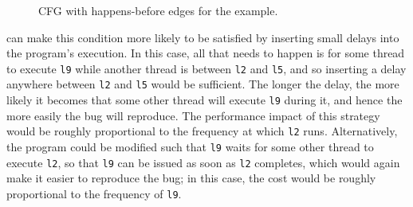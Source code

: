 \begin{figure}
  \caption{CFG with happens-before edges for the example.}
  \label{fig:using:example_hb_graph}
\end{figure}

{\Technique} can make this condition more likely to be satisfied by
inserting small delays into the program's execution.  In this case,
all that needs to happen is for some thread to execute \texttt{l9}
while another thread is between \texttt{l2} and \texttt{l5}, and so
inserting a delay anywhere between \texttt{l2} and \texttt{l5} would
be sufficient.  The longer the delay, the more likely it becomes that
some other thread will execute \texttt{l9} during it, and hence the
more easily the bug will reproduce.  The performance impact of this
strategy would be roughly proportional to the frequency at which
\texttt{l2} runs.  Alternatively, the program could be modified such
that \texttt{l9} waits for some other thread to execute \texttt{l2},
so that \texttt{l9} can be issued as soon as \texttt{l2} completes,
which would again make it easier to reproduce the bug; in this case,
the cost would be roughly proportional to the frequency of
\texttt{l9}.

